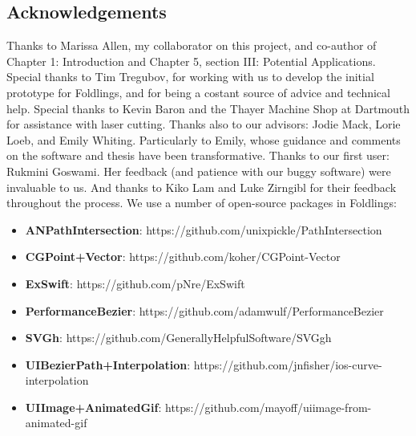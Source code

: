 \pagestyle{plain}
\begin{center}


\section*{Acknowledgements}
\singlespacing
Thanks to Marissa Allen, my collaborator on this project, and co-author of Chapter 1: Introduction and Chapter 5, section III: Potential Applications. \newline \newline
Special thanks to Tim Tregubov, for working with us to develop the initial prototype for Foldlings, and for being a costant source of advice and technical help. \newline \newline
Special thanks to Kevin Baron and the Thayer Machine Shop at Dartmouth for assistance with laser cutting. \newline \newline
Thanks also to our advisors: Jodie Mack, Lorie Loeb, and Emily Whiting.  Particularly to Emily, whose guidance and comments on the software and thesis have been transformative. \newline \newline
Thanks to our first user: Rukmini Goswami.  Her feedback (and patience with our buggy software) were invaluable to us. \newline \newline
And thanks to Kiko Lam and Luke Zirngibl for their feedback throughout the process. \newline \newline \newline
We use a number of open-source packages in Foldlings:

\begin{itemize}
  \item \textbf{ANPathIntersection}: https://github.com/unixpickle/PathIntersection
  \item \textbf{CGPoint+Vector}: https://github.com/koher/CGPoint-Vector
  \item \textbf{ExSwift}: https://github.com/pNre/ExSwift
  \item \textbf{PerformanceBezier}: https://github.com/adamwulf/PerformanceBezier
  \item \textbf{SVGh}: https://github.com/GenerallyHelpfulSoftware/SVGgh
  \item \textbf{UIBezierPath+Interpolation}: https://github.com/jnfisher/ios-curve-interpolation
  \item \textbf{UIImage+AnimatedGif}: https://github.com/mayoff/uiimage-from-animated-gif
\end{itemize}


\end{center}

\doublespacing
\cleardoublepage
